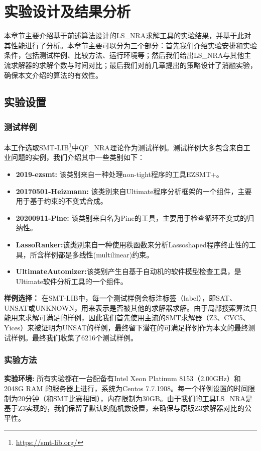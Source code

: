\chapter{实验设计及结果分析}\label{chap:Result}

本章节主要介绍基于前述算法设计的LS\_NRA求解工具的实验结果，并基于此对其性能进行了分析。本章节主要可以分为三个部分：首先我们介绍实验安排和实验条件，包括测试样例、比较方法、运行环境等；然后我们给出LS\_NRA与其他主流求解器的求解个数与时间对比；最后我们对前几章提出的策略设计了消融实验，确保本文介绍的算法的有效性。

\section{实验设置}
\subsection{测试样例}
本工作选取SMT-LIB\footnote{\url{https://smt-lib.org/}}中QF\_NRA理论作为测试样例。测试样例大多包含来自工业问题的实例，我们介绍其中一些类别如下：

\begin{itemize}
    \item \textbf{2019-ezsmt\cite{SusmanL16, ShenL18}:} 该类别来自一种处理non-tight程序的工具EZSMT+。
    \item \textbf{20170501-Heizmann\cite{Heizmann}:} 该类别来自Ultimate程序分析框架的一个组件，主要用于基于约束的不变式合成。
    \item \textbf{20200911-Pine\cite{Pine}:} 该类别来自名为Pine的工具，主要用于检查循环不变式的归纳性。
    \item \textbf{LassoRanker\cite{LeikeH15, HeizmannHLP13, Lasso3}:}该类别来自一种使用秩函数来分析Lassoshaped程序终止性的工具，所含样例都是多线性(multilinear)约束。
    \item \textbf{UltimateAutomizer:}该类别产生自基于自动机的软件模型检查工具，是Ultimate软件分析工具的一个组件。
\end{itemize}

\textbf{样例选择：} 在SMT-LIB中，每一个测试样例会标注标签（label），即SAT、UNSAT或UNKNOWN，用来表示是否被其他的求解器求解。由于局部搜索算法只能用来求解可满足的样例，因此我们首先使用主流的SMT求解器（Z3、CVC5、Yices）来被证明为UNSAT的样例，最终留下潜在的可满足样例作为本文的最终测试样例。最终我们收集了6216个测试样例。


\subsection{实验方法}
 \textbf{实验环境:} 所有实验都在一台配备有Intel Xeon Platinum 8153（2.00GHz）和2048G RAM 的服务器上进行，系统为Centos 7.7.1908。每一个样例设置的时间限制为20分钟（和SMT比赛相同），内存限制为30GB。由于我们的工具LS\_NRA是基于Z3实现的，我们保留了默认的随机数设置，来确保与原版Z3求解器对比的公平性。

